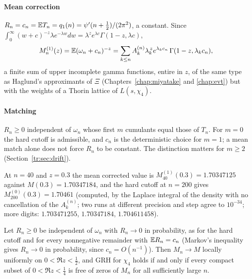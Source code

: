 \paragraph{Mean correction} $R_n=c_n=\mathbb{E} T_n=q_1(n)=\psi'(n+\frac12)/(2\pi^2)$, a constant. Since $\int_0^\infty(w+c)^{-z}\lambda e^{-\lambda w}dw=\lambda^ze^{\lambda c}\Gamma(1-z,\lambda c)$,
\[
M_n^{(1)}(z)=\mathbb{E}(\omega_n+c_n)^{-z}=\sum_{k\le n}A_k^{(n)}\lambda_k^{\,z}e^{\lambda_kc_n}\,\Gamma(1-z,\lambda_kc_n),
\]
a finite sum of upper incomplete gamma functions, entire in $z$, of the same type as Haglund's approximants of $\Xi$ \cite{Haglund09} (Chapters~\ref{chap:miyatake} and \ref{chap:evt}) but with the weights of a Thorin lattice of $L(s,\chi_4)$.

\paragraph{Matching} $R_n\ge0$ independent of $\omega_n$ whose first $m$ cumulants equal those of $T_n$. For $m=0$ the hard cutoff is admissible, and $c_n$ is the deterministic choice for $m=1$; a mean match alone does not force $R_n$ to be constant. The distinction matters for $m\ge2$ (Section~\ref{tr:sec:drift}).

At $n=40$ and $z=0.3$ the mean corrected value is $M_{40}^{(1)}(0.3)=1.70347125$ against $M(0.3)=1.70347184$, and the hard cutoff at $n=200$ gives $M_{200}^{(0)}(0.3)=1.70461$ (computed, by the Laplace integral of the density with no cancellation of the $A_k^{(n)}$; two runs at different precision and step agree to $10^{-34}$; more digits: $1.703471255$, $1.70347184$, $1.704611458$).

\begin{theorem}\label{tr:thm:local}
Let $R_n\ge0$ be independent of $\omega_n$ with $R_n\to0$ in probability, as for the hard cutoff and for every nonnegative remainder with $\mathbb{E} R_n=c_n$ (Markov's inequality gives $R_n\to0$ in probability, since $c_n=O(n^{-1})$). Then $M_n\to M$ locally uniformly on $0<\Re z<\frac12$, and GRH for $\chi_4$ holds if and only if every compact subset of $0<\Re z<\frac14$ is free of zeros of $M_n$ for all sufficiently large $n$.
\end{theorem}

